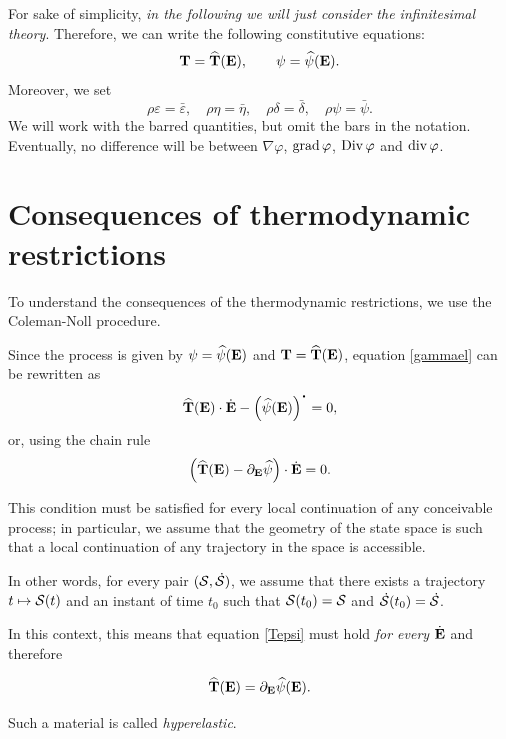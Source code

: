 For sake of simplicity, \textit{in the following we will just consider the infinitesimal theory}. Therefore, 
 we can write the following constitutive equations:
\begin{equation}
\mathbf{T}=\widehat{\mathbf{T}}(\mathbf{E}), \qquad \psi=\widehat{\psi}(\mathbf{E}).
\end{equation}
 Moreover, we set
\begin{equation}
\rho\varepsilon=\bar{\varepsilon}, \quad \rho\eta=\bar{\eta}, \quad \rho\delta=\bar\delta, \quad \rho \psi=\bar{\psi}.
\end{equation}
We will work with the barred quantities, but omit the bars in the notation. Eventually, no difference will be between $\nabla\varphi$, $\operatorname{grad}\varphi$, $\operatorname{Div}\varphi$ and $\operatorname{div}\varphi$.


\section{Consequences of thermodynamic restrictions}
To understand the consequences of the thermodynamic restrictions, we use the Coleman-Noll procedure. 

Since the process is given by $\psi = \widehat{\psi}(\mathbf{E})$ and $\mathbf{T} = \widehat{\mathbf{T}}(\mathbf{E})$, equation \eqref{gammael} can be rewritten as
\begin{equation}
	\widehat{\Tb}(\Eb) \cdot \dot{\Eb} - \left(\widehat{\psi}(\Eb)\right)^{\mathop{\vcenter{\hbox{\Large$\cdot$}}}} = 0,
\end{equation}
or, using the chain rule
\begin{equation}\label{Tepsi}
	\left( 	\widehat{\mathbf{T}}(\mathbf{E}) - \partial_{\mathbf{E}} \widehat{\psi} \right) \cdot \dot{\mathbf{E}} = 0.
\end{equation}

This condition must be satisfied for every local continuation of any conceivable process; in particular, we assume that the geometry of the state space is such that a local continuation of any trajectory in the space is accessible.

In other words, for every pair $(\mathcal{S}, \dot{\mathcal{S}})$, we assume that there exists a trajectory $t \mapsto \mathcal{S}(t)$ and an instant of time $t_0$ such that $\mathcal{S}(t_0) = \mathcal{S}$ and $\dot{\mathcal{S}}(t_0) = \dot{\mathcal{S}}$.

In this context, this means that equation \eqref{Tepsi} must hold \textit{for every} $\dot{\mathbf{E}}$ and therefore
\begin{definition}
	\begin{equation}\label{Tdevpsi}
		\widehat{\mathbf{T}}(\mathbf{E}) = \partial_{\mathbf{E}} \widehat{\psi}(\mathbf{E}).
	\end{equation}
\end{definition}
Such a material is called \textit{hyperelastic}.

